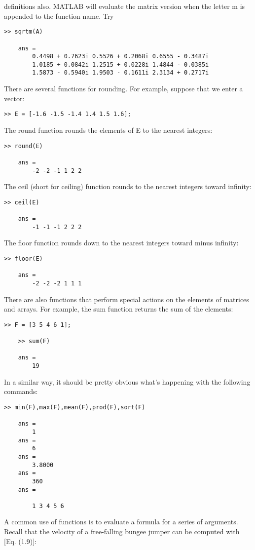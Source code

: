 \documentclass[../main.tex]{subfiles}
\begin{document}
definitions also. MATLAB will evaluate the matrix version when the letter m is appended to
the function name. Try
\begin{lstlisting}[frame=none, numbers=none]
	>> sqrtm(A)

	ans =
		0.4498 + 0.7623i 0.5526 + 0.2068i 0.6555 - 0.3487i
		1.0185 + 0.0842i 1.2515 + 0.0228i 1.4844 - 0.0385i
		1.5873 - 0.5940i 1.9503 - 0.1611i 2.3134 + 0.2717i
\end{lstlisting}

There are several functions for rounding. For example, suppose that we enter a vector:
\begin{lstlisting}[frame=none, numbers=none]
	>> E = [-1.6 -1.5 -1.4 1.4 1.5 1.6];
\end{lstlisting}
The round function rounds the elements of E to the nearest integers:
\begin{lstlisting}[frame=none, numbers=none]
	>> round(E)

	ans =
		-2 -2 -1 1 2 2
\end{lstlisting}
The ceil (short for ceiling) function rounds to the nearest integers toward infinity:
\begin{lstlisting}[frame=none, numbers=none]
	>> ceil(E)

	ans =
		-1 -1 -1 2 2 2
\end{lstlisting}
The floor function rounds down to the nearest integers toward minus infinity:
\begin{lstlisting}[frame=none, numbers=none]
	>> floor(E)

	ans =
		-2 -2 -2 1 1 1
\end{lstlisting}
There are also functions that perform special actions on the elements of matrices and
arrays. For example, the sum function returns the sum of the elements:
\begin{lstlisting}[frame=none, numbers=none]
	>> F = [3 5 4 6 1];

	>> sum(F)

	ans =
		19
\end{lstlisting}
In a similar way, it should be pretty obvious what's happening with the following commands:
\begin{lstlisting}[frame=none, numbers=none]
	>> min(F),max(F),mean(F),prod(F),sort(F)

	ans =
		1
	ans =
		6
	ans =
		3.8000
	ans =
		360
	ans =

		1 3 4 5 6
\end{lstlisting}


A common use of functions is to evaluate a formula for a series of arguments. Recall
that the velocity of a free-falling bungee jumper can be computed with [Eq. (1.9)]:
\end{document}
